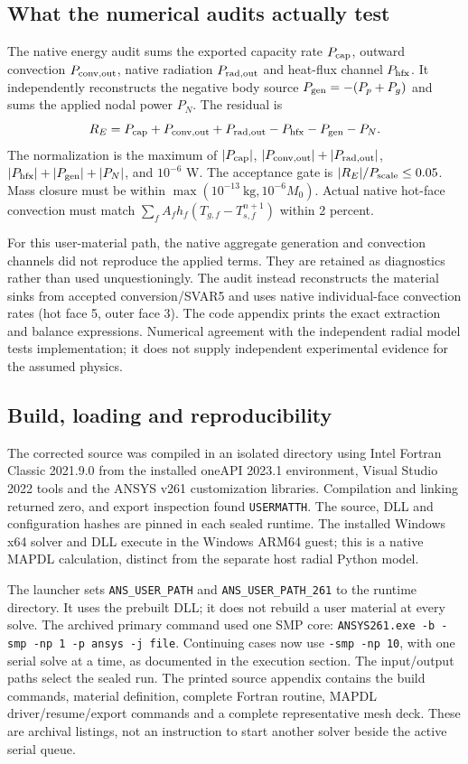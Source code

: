 \subsection{What the numerical audits actually test}
The native energy audit sums the exported capacity rate $P_{\rm cap}$, outward convection $P_{\rm conv,out}$, native radiation $P_{\rm rad,out}$ and heat-flux channel $P_{\rm hfx}$. It independently reconstructs the negative body source $P_{\rm gen}=-(P_p+P_g)$ and sums the applied nodal power $P_N$. The residual is
\begin{equation}
 R_E=P_{\rm cap}+P_{\rm conv,out}+P_{\rm rad,out}-P_{\rm hfx}-P_{\rm gen}-P_N.
\end{equation}
The normalization is the maximum of $|P_{\rm cap}|$, $|P_{\rm conv,out}|+|P_{\rm rad,out}|$, $|P_{\rm hfx}|+|P_{\rm gen}|+|P_N|$, and $10^{-6}$ W. The acceptance gate is $|R_E|/P_{\rm scale}\leq0.05$. Mass closure must be within $\max(10^{-13}\ \mathrm{kg},10^{-6}M_0)$. Actual native hot-face convection must match $\sum_fA_fh_f(T_{g,f}-T_{s,f}^{n+1})$ within 2 percent.

For this user-material path, the native aggregate generation and convection channels did not reproduce the applied terms. They are retained as diagnostics rather than used unquestioningly. The audit instead reconstructs the material sinks from accepted conversion/SVAR5 and uses native individual-face convection rates (hot face 5, outer face 3). The code appendix prints the exact extraction and balance expressions. Numerical agreement with the independent radial model tests implementation; it does not supply independent experimental evidence for the assumed physics.

\subsection{Build, loading and reproducibility}
The corrected source was compiled in an isolated directory using Intel Fortran Classic 2021.9.0 from the installed oneAPI 2023.1 environment, Visual Studio 2022 tools and the ANSYS v261 customization libraries. Compilation and linking returned zero, and export inspection found \texttt{USERMATTH}. The source, DLL and configuration hashes are pinned in each sealed runtime. The installed Windows x64 solver and DLL execute in the Windows ARM64 guest; this is a native MAPDL calculation, distinct from the separate host radial Python model.

The launcher sets \texttt{ANS\_USER\_PATH} and \texttt{ANS\_USER\_PATH\_261} to the runtime directory. It uses the prebuilt DLL; it does not rebuild a user material at every solve. The archived primary command used one SMP core: \texttt{ANSYS261.exe -b -smp -np 1 -p ansys -j file}. Continuing cases now use \texttt{-smp -np 10}, with one serial solve at a time, as documented in the execution section. The input/output paths select the sealed run. The printed source appendix contains the build commands, material definition, complete Fortran routine, MAPDL driver/resume/export commands and a complete representative mesh deck. These are archival listings, not an instruction to start another solver beside the active serial queue.

